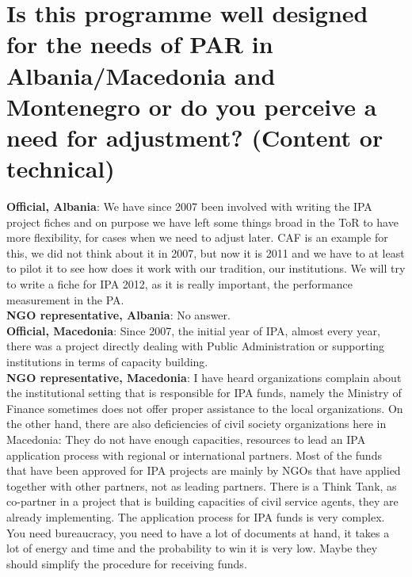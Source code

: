 \section{Is this programme well designed for the needs of PAR in Albania/Macedonia and Montenegro or do you perceive a need for adjustment? (Content or technical)}
\label{sec:par technical}
\textbf{Official, Albania}: We have since 2007 been involved with writing the IPA project fiches and on purpose we have left some things broad in the ToR to have more flexibility, for cases when we need to adjust later. CAF is an example for this, we did not think about it in 2007, but now it is 2011 and we have to at least to pilot it to see how does it work with our tradition, our institutions. We will try to write a fiche for IPA 2012, as it is really important, the performance measurement in the PA. \\
\textbf{NGO representative, Albania}: No answer. \\
\textbf{Official, Macedonia}: Since 2007, the initial year of IPA, almost every year, there was a project directly dealing with Public Administration or supporting institutions in terms of capacity building. \\
\textbf{NGO representative, Macedonia}: I have heard organizations complain about the institutional setting that is responsible for IPA funds, namely the Ministry of Finance sometimes does not offer proper assistance to the local organizations. On the other hand, there are also deficiencies of civil society organizations here in Macedonia: They do not have enough capacities, resources to lead an IPA application process with regional or international partners. Most of the funds that have been approved for IPA projects are mainly by NGOs that have applied together with other partners, not as leading partners. There is a Think Tank, as co-partner in a project that is building capacities of civil service agents, they are already implementing. The application process for IPA funds is very complex. You need bureaucracy, you need to have a lot of documents at hand, it takes a lot of energy and time and the probability to win it is very low. Maybe they should simplify the procedure for receiving funds. \\
